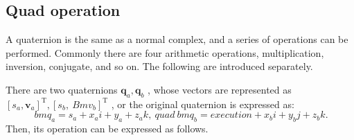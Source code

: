 \subsection{Quad operation}

A quaternion is the same as a normal complex, and a series of operations can be performed. Commonly there are four arithmetic operations, multiplication, inversion, conjugate, and so on. The following are introduced separately.

There are two quaternions $ \bm {q}_a, \bm {q}_b $ , whose vectors are represented as $ [s_a, \bm {v}_a]^ \mathrm {T}, [s_b, \ Bm {v}_b]^ \mathrm {T} $ , or the original quaternion is expressed as:
\[
\ bm {q} _a = s_a + x_ai + y_a + z_ak, \ quad  \ bm {q} _b = execution + x_bi + y_bj + z_bk.
\]
Then, its operation can be expressed as follows.

